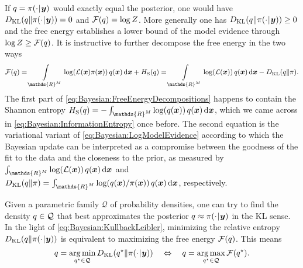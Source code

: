 If \(q = \pi(\cdot {\:\!}|{\:\!} \bm{y})\) would exactly equal the posterior,
one would have \(D_{\mathrm{KL}}(q \| \pi(\cdot {\:\!}|{\:\!} \bm{y})) = 0\) and \(\mathcal{F}(q) = \log Z\).
More generally one has \(D_{\mathrm{KL}}(q \| \pi(\cdot {\:\!}|{\:\!} \bm{y})) \geq 0\)
and the free energy establishes a lower bound of the model evidence through \(\log Z \geq \mathcal{F}(q)\).
It is instructive to further decompose the free energy in the two ways
\begin{equation} \label{eq:Bayesian:FreeEnergyDecompositions}
  \mathcal{F}(\varapprox)
  = \int\limits_{\mathds{R}^\dimParam} \log(\mathcal{L}(\bm{x}) \pi(\bm{x})) \, \varapprox(\bm{x}) \, \mathrm{d} \bm{x} + H_{\mathrm{S}}(\varapprox)
  = \int\limits_{\mathds{R}^\dimParam} \log(\mathcal{L}(\bm{x})) \, \varapprox(\bm{x}) \, \mathrm{d} \bm{x} - D_{\mathrm{KL}}(\varapprox \| \pi).
\end{equation}
The first part of \cref{eq:Bayesian:FreeEnergyDecompositions} happens to contain the Shannon entropy
\(H_{\mathrm{S}}(\varapprox) = - \int_{\mathds{R}^\dimParam} \log(\varapprox(\bm{x})) \, \varapprox(\bm{x}) \, \mathrm{d} \bm{x}\),
which we came across in \cref{eq:Bayesian:InformationEntropy} once before.
The second equation is the variational variant of \cref{eq:Bayesian:LogModelEvidence} according to which the Bayesian update
can be interpreted as a compromise between the goodness of the fit to the data and the closeness to the prior,
as measured by \(\int_{\mathds{R}^\dimParam} \log(\mathcal{L}(\bm{x})) \, \varapprox(\bm{x}) \, \mathrm{d} \bm{x}\) and
\(D_{\mathrm{KL}}(\varapprox \| \pi) = \int_{\mathds{R}^\dimParam} \log(\varapprox(\bm{x}) / \pi(\bm{x})) \, \varapprox(\bm{x}) \, \mathrm{d} \bm{x}\), respectively.
\par %
Given a parametric family \(\mathcal{Q}\) of probability densities, one can try to find the density \(q \in \mathcal{Q}\)
that best approximates the posterior \(q \approx \pi(\cdot {\:\!}|{\:\!} \bm{y})\) in the KL sense.
In the light of \cref{eq:Bayesian:KullbackLeibler}, minimizing the relative entropy \(D_{\mathrm{KL}}(q \| \pi(\cdot {\:\!}|{\:\!} \bm{y}))\)
is equivalent to maximizing the free energy \(\mathcal{F}(q)\).
This means
\begin{equation} \label{eq:Bayesian:MinimizeKullbackLeibler}
  q = \operatorname*{arg\,min}_{q^{\star} \in \mathcal{Q}} D_{\mathrm{KL}}(q^{\star} \| \pi(\cdot {\:\!}|{\:\!} \bm{y}))
  \quad \Leftrightarrow \quad
  q = \operatorname*{arg\,max}_{q^{\star} \in \mathcal{Q}} \mathcal{F}(q^{\star}).
\end{equation}

